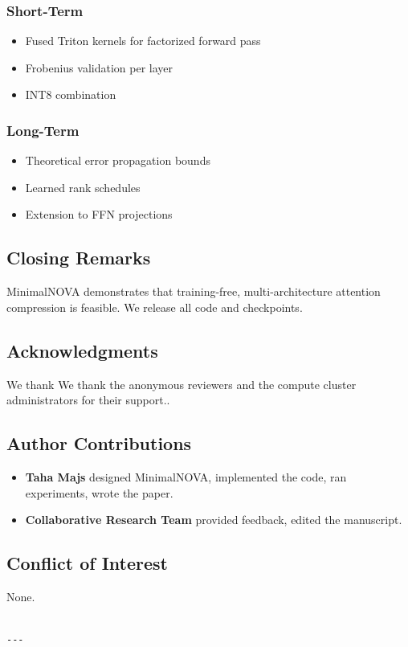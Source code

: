 \subsubsection{Short-Term}
\begin{itemize}
\item Fused Triton kernels for factorized forward pass
\item Frobenius validation per layer
\item INT8 combination

\end{itemize}
\subsubsection{Long-Term}
\begin{itemize}
\item Theoretical error propagation bounds
\item Learned rank schedules
\item Extension to FFN projections

\end{itemize}
\subsection{Closing Remarks}

MinimalNOVA demonstrates that training-free, multi-architecture attention 
compression is feasible. We release all code and checkpoints.

\subsection{Acknowledgments}

We thank We thank the anonymous reviewers and the compute cluster administrators for their support..

\subsection{Author Contributions}

\begin{itemize}
\item \textbf{Taha Majs} designed MinimalNOVA, implemented the code, ran experiments,
  wrote the paper.
\item \textbf{Collaborative Research Team} provided feedback, edited the manuscript.

\end{itemize}
\subsection{Conflict of Interest}

None.
\begin{lstlisting}

---
\end{lstlisting}